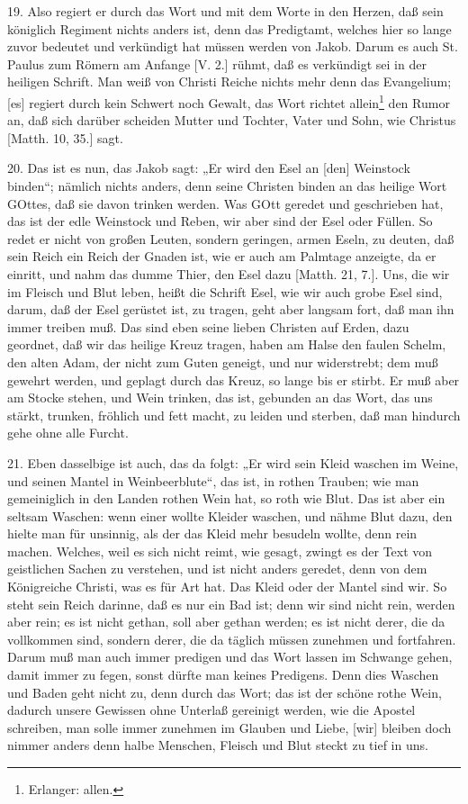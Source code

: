 19. Also regiert er durch das Wort und mit dem Worte in den Herzen, daß sein königlich Regiment nichts anders ist, denn das Predigtamt, welches hier so lange zuvor bedeutet und verkündigt hat müssen werden von Jakob. Darum es auch St. Paulus zum Römern am Anfange [V. 2.] rühmt, daß es verkündigt sei in der heiligen Schrift. Man weiß von Christi Reiche nichts mehr denn das Evangelium; [es] regiert durch kein Schwert noch Gewalt, das Wort richtet allein\footnote{Erlanger: allen.} den Rumor an, daß sich darüber scheiden Mutter und Tochter, Vater und Sohn, wie Christus [Matth. 10, 35.] sagt.

20. Das ist es nun, das Jakob sagt: „Er wird den Esel an [den] Weinstock binden“; nämlich nichts anders, denn seine Christen binden an das heilige Wort GOttes, daß sie davon trinken werden. Was GOtt geredet und geschrieben hat, das ist der edle Weinstock und Reben, wir aber sind der Esel oder Füllen. So redet er nicht von großen Leuten, sondern geringen, armen Eseln, zu deuten, daß sein Reich ein Reich der Gnaden ist, wie er auch am Palmtage anzeigte, da er einritt, und nahm das dumme Thier, den Esel dazu [Matth. 21, 7.]. Uns, die wir im Fleisch und Blut leben, heißt die Schrift Esel, wie wir auch grobe Esel sind, darum, daß der Esel gerüstet ist, zu tragen, geht aber langsam fort, daß man ihn immer treiben muß. Das sind eben seine lieben Christen auf Erden, dazu geordnet, daß wir das heilige Kreuz tragen, haben am Halse den faulen Schelm, den alten Adam, der nicht zum Guten geneigt, und nur widerstrebt; dem muß gewehrt werden, und geplagt durch das Kreuz, so lange bis er stirbt. Er muß aber am Stocke stehen, und Wein trinken, das ist, gebunden an das Wort, das uns stärkt, trunken, fröhlich und fett macht, zu leiden und sterben, daß man hindurch gehe ohne alle Furcht.

21. Eben dasselbige ist auch, das da folgt: „Er wird sein Kleid waschen im Weine, und seinen Mantel in Weinbeerblute“, das ist, in rothen Trauben; wie man gemeiniglich in den Landen rothen Wein hat, so roth wie Blut. Das ist aber ein seltsam Waschen: wenn einer wollte Kleider waschen, und nähme Blut dazu, den hielte man für unsinnig, als der das Kleid mehr besudeln wollte, denn rein machen. Welches, weil es sich nicht reimt, wie gesagt, zwingt es der Text von geistlichen Sachen zu verstehen, und ist nicht anders geredet, denn von dem Königreiche Christi, was es für Art hat. Das Kleid oder der Mantel sind wir. So steht sein Reich darinne, daß es nur ein Bad ist; denn wir sind nicht rein, werden aber rein; es ist nicht gethan, soll aber gethan werden; es ist nicht derer, die da vollkommen sind, sondern derer, die da täglich müssen zunehmen und fortfahren. Darum muß man auch immer predigen und das Wort lassen im Schwange gehen, damit immer zu fegen, sonst dürfte man keines Predigens. Denn dies Waschen und Baden geht nicht zu, denn durch das Wort; das ist der schöne rothe Wein, dadurch unsere Gewissen ohne Unterlaß gereinigt werden, wie die Apostel schreiben, man solle immer zunehmen im Glauben und Liebe, [wir] bleiben doch nimmer anders denn halbe Menschen, Fleisch und Blut steckt zu tief in uns.

